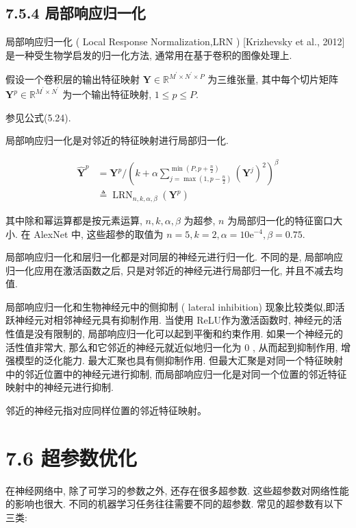 \documentclass[10pt]{article}
\begin{document}
\subsection*{7.5.4 局部响应归一化}
局部响应归一化 ( Local Response Normalization,LRN ) [Krizhevsky et al., 2012] 是一种受生物学启发的归一化方法, 通常用在基于卷积的图像处理上.

假设一个卷积层的输出特征映射 $\boldsymbol{Y} \in \mathbb{R}^{M^{\prime} \times N^{\prime} \times P}$ 为三维张量, 其中每个切片矩阵 $\boldsymbol{Y}^{p} \in \mathbb{R}^{M^{\prime} \times N^{\prime}}$ 为一个输出特征映射, $1 \leq p \leq P$.

参见公式(5.24).

局部响应归一化是对邻近的特征映射进行局部归一化.


\begin{align*}
\hat{\boldsymbol{Y}}^{p} & =\boldsymbol{Y}^{p} /\left(k+\alpha \sum_{j=\max \left(1, p-\frac{n}{2}\right)}^{\min \left(P, p+\frac{n}{2}\right)}\left(\boldsymbol{Y}^{j}\right)^{2}\right)^{\beta}  \tag{7.65}\\
& \triangleq \operatorname{LRN}_{n, k, \alpha, \beta}\left(\boldsymbol{Y}^{p}\right) \tag{7.66}
\end{align*}


其中除和幂运算都是按元素运算, $n, k, \alpha, \beta$ 为超参, $n$ 为局部归一化的特征窗口大小. 在 AlexNet 中, 这些超参的取值为 $n=5, k=2, \alpha=10 \mathrm{e}^{-4}, \beta=0.75$.

局部响应归一化和层归一化都是对同层的神经元进行归一化. 不同的是, 局部响应归一化应用在激活函数之后, 只是对邻近的神经元进行局部归一化, 并且不减去均值.

局部响应归一化和生物神经元中的侧抑制 ( lateral inhibition) 现象比较类似,即活跃神经元对相邻神经元具有抑制作用. 当使用 ReLU作为激活函数时, 神经元的活性值是没有限制的, 局部响应归一化可以起到平衡和约束作用. 如果一个神经元的活性值非常大, 那么和它邻近的神经元就近似地归一化为 0 , 从而起到抑制作用, 增强模型的泛化能力. 最大汇聚也具有侧抑制作用. 但最大汇聚是对同一个特征映射中的邻近位置中的神经元进行抑制, 而局部响应归一化是对同一个位置的邻近特征映射中的神经元进行抑制.

邻近的神经元指对应同样位置的邻近特征映射。

\section*{7.6 超参数优化}
在神经网络中, 除了可学习的参数之外, 还存在很多超参数. 这些超参数对网络性能的影响也很大. 不同的机器学习任务往往需要不同的超参数. 常见的超参数有以下三类:
\end{document}
